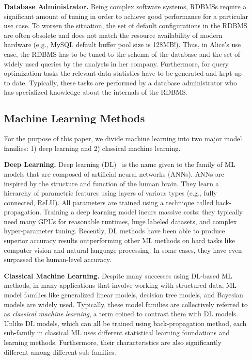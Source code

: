 \vspace{2mm}
\noindent \textbf{Database Administrator.} Being complex software systems, RDBMSs require a significant amount of tuning in order to achieve good performance for a particular use case.
To worsen the situation, the set of default configurations in the RDBMS are often obsolete and does not match the resource availability of modern hardware (e.g., MySQL default buffer pool size is 128MB!).
Thus, in Alice's use case, the RDBMS has to be tuned to the schema of the database and the set of widely used queries by the analysts in her company.
Furthermore, for query optimization tasks the relevant data statistics have to be generated and kept up to date.
Typically, these tasks are performed by a database administrator who has specialized knowledge about the internals of the RDBMS.


\subsection{Machine Learning Methods}
For the purpose of this paper, we divide machine learning into two major model families: 1) deep learning and 2) classical machine learning.

\vspace{2mm}
\noindent \textbf{Deep Learning. } Deep learning (DL)~\cite{dlbook} is the name given to the family of ML models that are composed of artificial neural networks (ANNs).
ANNs are inspired by the structure and function of the human brain.
They learn a hierarchy of parametric features using layers of various types (e.g., fully connected, ReLU).
All parameters are trained using a technique called back-propagation.
Training a deep learning model incurs massive costs: they typically need many GPUs for reasonable runtimes, huge labeled datasets, and complex hyper-parameter tuning.
Recently, DL methods have been able to produce superior accuracy results outperforming other ML methods on hard tasks like computer vision and natural language processing.
In some cases, they have even surpassed the human-level accuracy.

\vspace{2mm}
\noindent \textbf{Classical Machine Learning. } Despite many successes using DL-based ML methods, in many applications that involve working with structured data, ML model families like generalized linear models, decision tree models, and Bayesian models are widely used.
Typically, these model families are collectively referred to as \textit{classical machine learning}, a term coined to contrast them with DL models.
Unlike DL models, which can all be trained using back-propagation method, each sub-family in classical ML uses different statistical learning foundations and learning methods.
Furthermore, their characteristics are also significantly different among different sub-families.

